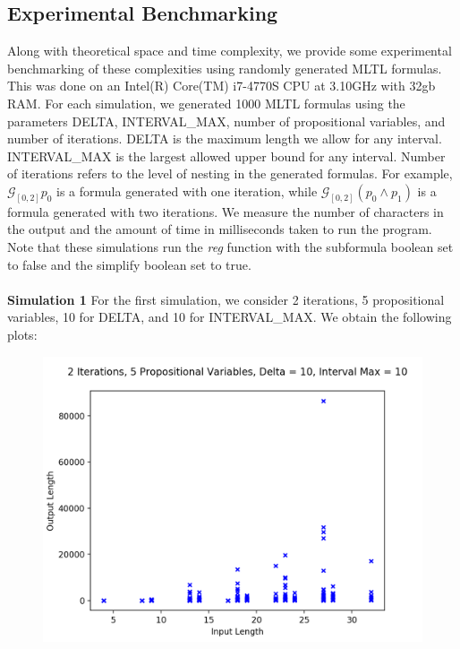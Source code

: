 \documentclass[runningheads]{llncs}
\begin{document}
\subsection{Experimental Benchmarking}
 Along with theoretical space and time complexity, we provide some experimental benchmarking of these complexities using randomly generated MLTL formulas.
This was done on an Intel(R) Core(TM) i7-4770S CPU at 3.10GHz with 32gb RAM.
For each simulation, we generated 1000 MLTL formulas using the parameters DELTA, INTERVAL\_MAX, number of propositional variables, and number of iterations. DELTA is the maximum length we allow for any interval. INTERVAL\_MAX is the largest allowed upper bound for any interval. Number of iterations refers to the level of nesting in the generated formulas. For example, $\mathcal{G}_{[0,2]}p_0$ is a formula generated with one iteration, while $\mathcal{G}_{[0,2]}(p_0 \land p_1)$ is a formula generated with two iterations. We measure the number of characters in the output and the amount of time in milliseconds taken to run the program. Note that these simulations run the \textit{reg} function with the subformula boolean set to false and the simplify boolean set to true.
\\
\\
\noindent\textbf{Simulation 1}
For the first simulation, we consider 2 iterations, 5 propositional variables, 10 for DELTA, and 10 for INTERVAL\_MAX. We obtain the following plots:
\begin{minipage}{0.5 \textwidth}
    \begin{figure}[H]
    \centering
    \includegraphics[scale=0.39]{images/Sim1Length.png}
    \end{figure}
\end{minipage}%
\end{document}
